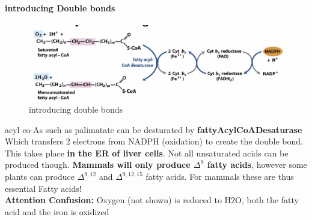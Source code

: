 \documentclass[../main.tex]{subfiles}
\begin{document}
\paragraph{introducing Double bonds}
\begin{figure}[H]
    \centering
    \includegraphics[width=1\linewidth]{DBonds.png}
    \caption{introducing double bonds}
    \label{fig:enter-label}
\end{figure}
acyl co-As such as palimatate can be desturated by \textbf{\gls{fattyAcylCoADesaturase}} Which transfers 2 electrons from NADPH (oxidation) to create the double bond. This takes place \textbf{in the ER of liver cells}. Not all unsaturated acids can be produced though.\textbf{ Mammals will only produce $\Delta^9$ fatty acids}, however some plants can produce $\Delta^{9,12}$ and $\Delta^{9,12,15}$ fatty acids. For mammals these are thus essential Fatty acids!\\
\indent \textbf{Attention Confusion:} Oxygen (not shown) is reduced to H2O, both the fatty acid and the iron is oxidized
\end{document}
